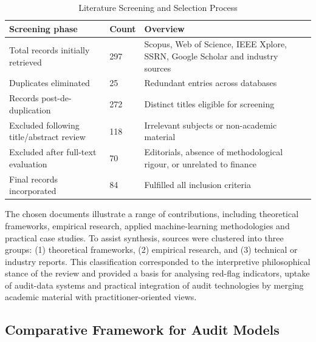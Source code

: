 \documentclass[preprint,12pt]{elsarticle}
\begin{document}

\begin{table}[!t]
\caption{Literature Screening and Selection Process}
\label{tab:protocol}
\centering
\footnotesize
\begin{tabular}{p{} p{} p{}}
\toprule
\textbf{Screening phase} & \textbf{Count} & \textbf{Overview} \\
\midrule
Total records initially retrieved & 297 & Scopus, Web of Science, IEEE Xplore, SSRN, Google Scholar and industry sources \\
Duplicates eliminated & 25 & Redundant entries across databases \\
Records post-de-duplication & 272 & Distinct titles eligible for screening \\
Excluded following title/abstract review & 118 & Irrelevant subjects or non-academic material \\
Excluded after full-text evaluation & 70 & Editorials, absence of methodological rigour, or unrelated to finance \\
Final records incorporated & 84 & Fulfilled all inclusion criteria \\
\bottomrule
\end{tabular}
\end{table}

The chosen documents illustrate a range of contributions, including theoretical frameworks, empirical research, applied machine-learning methodologies and practical case studies. To assist synthesis, sources were clustered into three groups: (1) theoretical frameworks, (2) empirical research, and (3) technical or industry reports. This classification corresponded to the interpretive philosophical stance of the review and provided a basis for analysing red-flag indicators, uptake of audit-data systems and practical integration of audit technologies by merging academic material with practitioner-oriented views.

\subsection{Comparative Framework for Audit Models}
\end{document}

